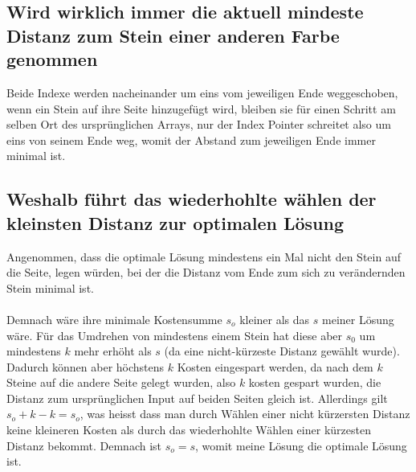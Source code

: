 \documentclass[12pt]{article}
\begin{document}
	\subsection{Wird wirklich immer die aktuell mindeste Distanz zum Stein einer anderen Farbe genommen} Beide Indexe werden nacheinander um eins vom jeweiligen Ende weggeschoben, wenn ein Stein auf ihre Seite hinzugefügt wird, bleiben sie für einen Schritt am selben Ort des ursprünglichen Arrays, nur der Index Pointer schreitet also um eins von seinem Ende weg, womit der Abstand zum jeweiligen Ende immer minimal ist. 
	
\subsection{Weshalb führt das wiederhohlte wählen der kleinsten Distanz zur optimalen Lösung} Angenommen, dass die optimale Lösung mindestens ein Mal nicht den Stein auf die Seite, legen würden, bei der die Distanz vom Ende zum sich zu verändernden Stein minimal ist.\\\\ Demnach wäre ihre minimale Kostensumme $s_o$ kleiner als das $s$ meiner Lösung wäre. Für das Umdrehen von mindestens einem Stein hat diese aber  $s_0$ um mindestens $k$ mehr erhöht als $s$ (da eine nicht-kürzeste Distanz gewählt wurde). Dadurch können aber höchstens $k$ Kosten eingespart werden, da nach dem $k$ Steine auf die andere Seite gelegt wurden, also $k$ kosten gespart wurden, die Distanz zum ursprünglichen Input auf beiden Seiten gleich ist. Allerdings gilt $s_o + k - k = s_o$,  was heisst dass man durch Wählen einer nicht kürzersten Distanz keine kleineren Kosten als durch das wiederhohlte Wählen einer kürzesten Distanz bekommt. Demnach ist $s_o = s$, womit meine Lösung die optimale Lösung ist.
	
\end{document}
